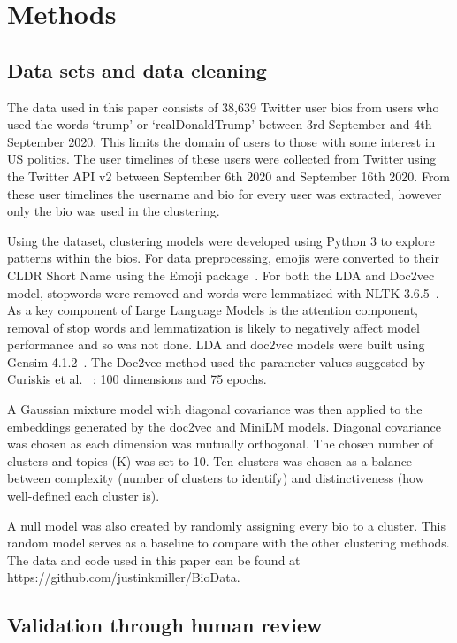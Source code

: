 \documentclass{article}
\begin{document}
\section{Methods}

\subsection{Data sets and data cleaning}

The data used in this paper consists of 38,639 Twitter user bios from users who used the words `trump' or `realDonaldTrump' between 3rd September and 4th September 2020. This limits the domain of users to those with some interest in US politics. The user timelines of these users were collected from Twitter using the Twitter API v2 between September 6th 2020 and September 16th 2020. From these user timelines the username and bio for every user was extracted, however only the bio was used in the clustering.

Using the dataset, clustering models were developed using Python 3 to explore patterns within the bios. For data preprocessing, emojis were converted to their CLDR Short Name using the Emoji package~\cite{kimCarpedm20Emoji2023}. For both the LDA and Doc2vec model, stopwords were removed and words were lemmatized with NLTK 3.6.5~\cite{loper2002nltk}.
As a key component of Large Language Models is the attention component, removal of stop words and lemmatization is likely to negatively affect model performance and so was not done.
LDA and doc2vec models were built using Gensim 4.1.2~\cite{rehurek2011gensim}. The Doc2vec method used the parameter values suggested by Curiskis et al. ~\cite{curiskis2020}: 100 dimensions and 75 epochs.    

A Gaussian mixture model with diagonal covariance was then applied to the embeddings generated by the doc2vec and MiniLM models. Diagonal covariance was chosen as each dimension was mutually orthogonal. The chosen number of clusters and topics (K) was set to 10. Ten clusters was chosen as a balance between complexity (number of clusters to identify) and distinctiveness (how well-defined each cluster is).
 
A null model was also created by randomly assigning every bio to a cluster.  This random model serves as a baseline to compare with the other clustering methods.  The data and code used in this paper can be found at https://github.com/justinkmiller/BioData.

\subsection{Validation through human review}
\end{document}

